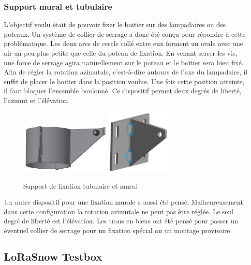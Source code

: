 \subsubsection{Support mural et tubulaire}

L’objectif voulu était de pouvoir fixer le boitier sur des lampadaires ou des poteaux. Un système de 
collier de serrage a donc été conçu pour répondre à cette problématique. Les deux arcs de cercle collé 
entre eux forment un ovale avec une air un peu plus petite que celle du poteau de fixation. En venant 
serrer les vis, une force de serrage agira naturellement sur le poteau et le boitier sera bien fixé. 
Afin de régler la rotation azimutale, c’est-à-dire autours de l’axe du lampadaire, il suffit de placer 
le boitier dans la position voulue. Une fois cette position atteinte, il faut bloquer l’ensemble boulonné. 
Ce dispositif permet deux degrés de liberté, l’azimut et l’élévation.

\begin{figure}[H]
    \centering
    \includegraphics[width=0.4\textwidth]{Images/photos_PGA/collierSupport2.PNG}
    \includegraphics[width=0.3\textwidth]{Images/photos_PGA/supportmural2.PNG}
    \caption{Support de fixation tubulaire et mural}
    \label{fig:supfix}
\end{figure}

Un autre dispositif pour une fixation murale a aussi été pensé. Malheureusement dans cette configuration 
la rotation azimutale ne peut pas être réglée. Le seul degré de liberté est l’élévation. Les trous en 
bleus ont été pensé pour passer un éventuel collier de serrage pour un fixation spécial ou un montage 
provisoire.

\subsection{LoRaSnow Testbox}

